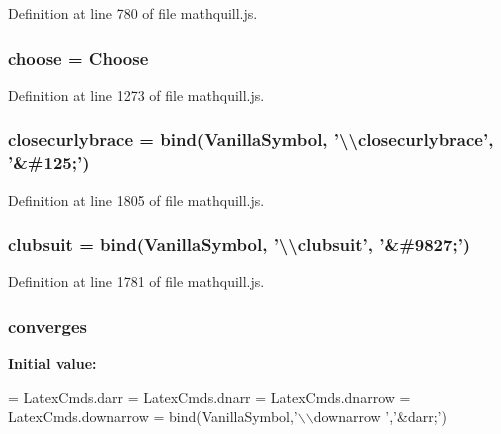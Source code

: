 Definition at line 780 of file mathquill.\-js.

\subsubsection[{choose}]{ choose = {\bf Choose}}\label{mathquill_8js_a19c11c0285c7cdccd84de690cba2909a}


Definition at line 1273 of file mathquill.\-js.

\subsubsection[{closecurlybrace}]{ closecurlybrace = {\bf bind}({\bf Vanilla\-Symbol}, '\textbackslash{}\textbackslash{}closecurlybrace', '\&\#125;')}\label{mathquill_8js_a1fc441f66854299cf85bb26c61f4e344}


Definition at line 1805 of file mathquill.\-js.

\subsubsection[{clubsuit}]{ clubsuit = {\bf bind}({\bf Vanilla\-Symbol}, '\textbackslash{}\textbackslash{}clubsuit', '\&\#9827;')}\label{mathquill_8js_adc7b29f8d3a310cb933c5ad405339b0f}


Definition at line 1781 of file mathquill.\-js.

\subsubsection[{converges}]{ converges}\label{mathquill_8js_a9e1a6684d66828fdd0281834a167c314}
{\bfseries Initial value\-:}
\begin{DoxyCode}
=
LatexCmds.darr = LatexCmds.dnarr = LatexCmds.dnarrow = LatexCmds.downarrow =
  bind(VanillaSymbol,\textcolor{stringliteral}{'\(\backslash\)\(\backslash\)downarrow '},\textcolor{stringliteral}{'&darr;'})
\end{DoxyCode}


